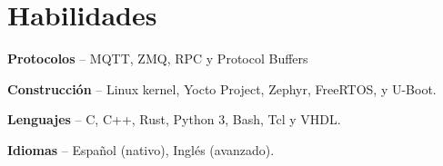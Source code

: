 \section{Habilidades}
\begin{small}
	\parbox[t][][t]{\linewidth}{
		\textbf{Protocolos} -- {MQTT, ZMQ, RPC y Protocol Buffers}
		\bigbreak
	}
	\parbox[t][][t]{\linewidth}{
		\textbf{Construcción} -- {Linux kernel, Yocto Project, Zephyr, FreeRTOS, y U-Boot.}
		\bigbreak
	}
	\parbox[t][][t]{\linewidth}{
		\textbf{Lenguajes} -- {C, C++, Rust, Python 3, Bash, Tcl y VHDL.}
		\bigbreak
	}
	\parbox[t][][t]{\linewidth}{
		\textbf{Idiomas} -- {Español (nativo), Inglés (avanzado).}
		\bigbreak
	}
\end{small}
